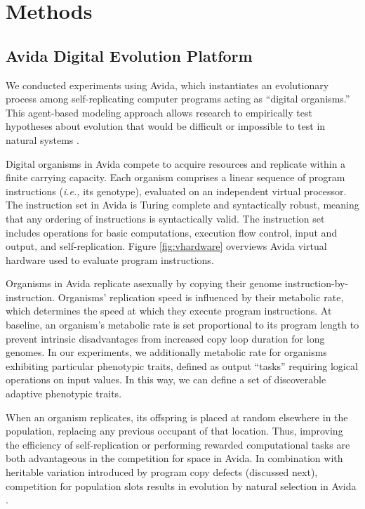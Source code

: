 \section{Methods} \label{sec:methods}

\subsection{Avida Digital Evolution Platform}

We conducted experiments using Avida, which instantiates an evolutionary process among self-replicating computer programs acting as ``digital organisms.''
This agent-based modeling approach allows research to empirically test hypotheses about evolution that would be difficult or impossible to test in natural systems \citep{Ofria:2009avida}.



Digital organisms in Avida compete to acquire resources and replicate within a finite carrying capacity.
Each organism comprises a linear sequence of program instructions (\textit{i.e.,} its genotype), evaluated on an independent virtual processor.
The instruction set in Avida is Turing complete and syntactically robust, meaning that any ordering of instructions is syntactically valid.
The instruction set includes operations for basic computations, execution flow control, input and output, and self-replication.
Figure \ref{fig:vhardware} overviews Avida virtual hardware used to evaluate program instructions.

Organisms in Avida replicate asexually by copying their genome instruction-by-instruction.
Organisms' replication speed is influenced by their metabolic rate, which determines the speed at which they execute program instructions.
At baseline, an organism's metabolic rate is set proportional to its program length to prevent intrinsic disadvantages from increased copy loop duration for long genomes.
In our experiments, we additionally metabolic rate for organisms exhibiting particular phenotypic traits, defined as output ``tasks'' requiring logical operations on input values.
In this way, we can define a set of discoverable adaptive phenotypic traits.

When an organism replicates, its offspring is placed at random elsewhere in the population, replacing any previous occupant of that location.
Thus, improving the efficiency of self-replication or performing rewarded computational tasks are both advantageous in the competition for space in Avida.
In combination with heritable variation introduced by program copy defects (discussed next), competition for population slots results in evolution by natural selection in Avida \citep{pennock2007models}.

